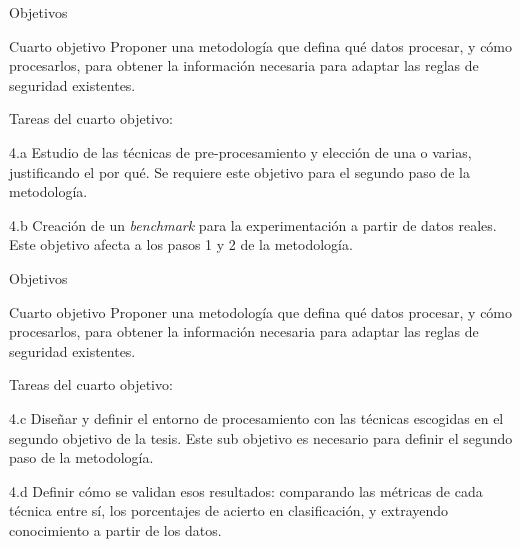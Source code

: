 \documentclass{beamer}
\begin{document}
\begin{frame}{Objetivos}

\begin{block}{Cuarto objetivo}
Proponer una metodología que defina qué datos procesar, y cómo procesarlos, para obtener la información necesaria para adaptar las reglas de seguridad existentes.
\end{block}

Tareas del cuarto objetivo:

\begin{description}
  \begin{small}
  \item[4.a] Estudio de las técnicas de pre-procesamiento y elección de una o varias, justificando el por qué. Se requiere este objetivo para el segundo paso de la metodología.
  \item[4.b] Creación de un \textit{benchmark} para la experimentación a partir de datos reales. Este objetivo afecta a los pasos 1 y 2 de la metodología.
  \end{small}
\end{description}

\end{frame}

\begin{frame}{Objetivos}

\begin{block}{Cuarto objetivo}
Proponer una metodología que defina qué datos procesar, y cómo procesarlos, para obtener la información necesaria para adaptar las reglas de seguridad existentes.
\end{block}

Tareas del cuarto objetivo:

\begin{description}
  \begin{small}
  \item[4.c] Diseñar y definir el entorno de procesamiento con las técnicas escogidas en el segundo objetivo de la tesis. Este sub objetivo es necesario para definir el segundo paso de la metodología.
  \item[4.d] Definir cómo se validan esos resultados: comparando las métricas de cada técnica entre sí, los porcentajes de acierto en clasificación, y extrayendo conocimiento a partir de los datos.
  \end{small}
\end{description}

\end{frame}
\end{document}
